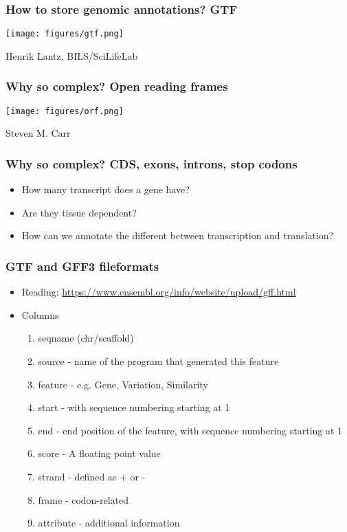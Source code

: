 \documentclass{beamer}
\begin{document}
\begin{frame}
  \frametitle{How to store genomic annotations? GTF}
  
\centering
\texttt{[image: figures/gtf.png]}

Henrik Lantz, BILS/SciLifeLab
\end{frame}



\begin{frame}
  \frametitle{Why so complex? Open reading frames}
  
\centering
\texttt{[image: figures/orf.png]}

Steven M. Carr 
\end{frame}


\begin{frame}
  \frametitle{Why so complex? CDS, exons, introns, stop codons}
  \begin{itemize}
  \item How many transcript does a gene have?
  \item Are they tissue dependent?
  \item How can we annotate the different between transcription and translation?
  \end{itemize}

\end{frame}

\begin{frame}
  \frametitle{GTF and GFF3 fileformats}
  \begin{itemize}
  \item Reading: \url{https://www.ensembl.org/info/website/upload/gff.html}
  \item Columns
    \begin{enumerate}
    \item seqname (chr/scaffold)
    \item source - name of the program that generated this feature
    \item feature -  e.g. Gene, Variation, Similarity
    \item start - with sequence numbering starting at 1
    \item end - end position of the feature, with sequence numbering starting at 1
    \item score - A floating point value
    \item strand - defined as + or -
    \item frame - codon-related
    \item attribute - additional information
    \end{enumerate}
  \end{itemize}
\end{frame}
\end{document}
